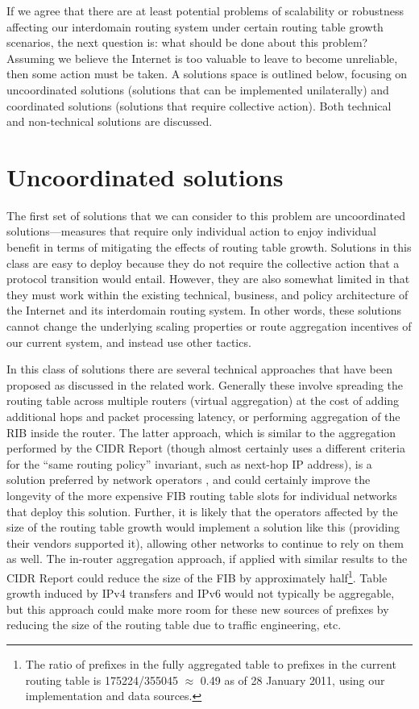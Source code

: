If we agree that there are at least potential problems of scalability or
robustness affecting our interdomain routing system under certain routing table
growth scenarios, the next question is: what should be done about this problem?
Assuming we believe the Internet is too valuable to leave to become unreliable,
then some action must be taken. A solutions space is outlined below, focusing
on uncoordinated solutions (solutions that can be implemented unilaterally) and
coordinated solutions (solutions that require collective action). Both technical
and non-technical solutions are discussed.

\section{Uncoordinated solutions}
The first set of solutions that we can consider to this problem are
uncoordinated solutions---measures that require only individual action to
enjoy individual benefit in terms of mitigating the effects of routing table
growth. Solutions in this class are easy to deploy because they do not require
the collective action that a protocol transition would entail. However, they
are also somewhat limited in that they must work within the existing technical,
business, and policy architecture of the Internet and its interdomain routing
system. In other words, these solutions cannot change the underlying scaling
properties or route aggregation incentives of our current system, and instead
use other tactics.

In this class of solutions there are several technical approaches that have
been proposed as discussed in the related work. Generally these involve
spreading the routing table across multiple routers (virtual aggregation)
\cite{Ballani:2009tg} at the cost of adding additional hops and packet
processing latency, or performing aggregation of the RIB inside the router. The
latter approach, which is similar to the aggregation performed by the CIDR
Report (though almost certainly uses a different criteria for the ``same
routing policy'' invariant, such as next-hop IP address),
is a solution preferred by network operators \cite{Zhao:2010fu}, and could
certainly improve the longevity of the more expensive FIB routing table slots
for individual networks that deploy this solution. Further, it is likely that
the operators affected by the size of the routing table growth would implement
a solution like this (providing their vendors supported it), allowing other
networks to continue to rely on them as well. The in-router aggregation
approach, if applied with similar results to the CIDR Report could reduce the
size of the FIB by approximately half\footnote{The ratio of prefixes in the
fully aggregated table to prefixes in the current routing table is
175224/355045 $\approx$ 0.49 as of 28 January 2011, using our implementation
and data sources.}. Table growth induced by IPv4 transfers and IPv6 would not
typically be aggregable, but this approach could make more room for these new
sources of prefixes by reducing the size of the routing table due to traffic
engineering, etc.

